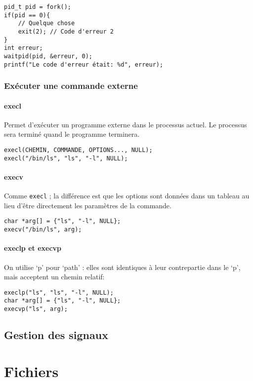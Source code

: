 \documentclass[10pt,a4paper,french]{article}
\begin{document}
\begin{verbatim}
pid_t pid = fork();
if(pid == 0){
    // Quelque chose
    exit(2); // Code d'erreur 2
}
int erreur;
waitpid(pid, &erreur, 0);
printf("Le code d'erreur était: %d", erreur);
\end{verbatim}

\subsubsection{Exécuter une commande externe}

\paragraph{execl}
Permet d'exécuter un programme externe dans le processus actuel. Le processus sera terminé quand le programme terminera.
\begin{verbatim}
execl(CHEMIN, COMMANDE, OPTIONS..., NULL);
execl("/bin/ls", "ls", "-l", NULL);
\end{verbatim}

\paragraph{execv}
Comme {\tt execl} ; la différence est que les options sont données dans un tableau au lieu d'être directement les paramètres de la commande.
\begin{verbatim}
char *arg[] = {"ls", "-l", NULL};
execv("/bin/ls", arg);
\end{verbatim}

\paragraph{execlp et execvp}
On utilise `p' pour `path' : elles sont identiques à leur contrepartie dans le `p', mais acceptent un chemin relatif:
\begin{verbatim}
execlp("ls", "ls", "-l", NULL);
char *arg[] = {"ls", "-l", NULL};
execvp("ls", arg);
\end{verbatim}

\subsection{Gestion des signaux}

\section{Fichiers}
\end{document}
